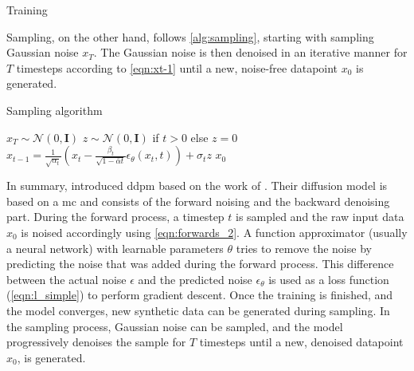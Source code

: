 \begin{algorithm}[T]
  \caption[Training algorithm]{Training \cite[p. 4]{ho2020DenoisingDiffusionProbabilistic}}
  \label{alg:training}
\end{algorithm}


Sampling, on the other hand, follows \autoref{alg:sampling}, starting with sampling Gaussian noise $x_T$.
The Gaussian noise is then denoised in an iterative manner for $T$ timesteps according to \autoref{eqn:xt-1} until a new, noise-free datapoint $x_0$ is generated.

\begin{algorithm}[H]
\caption[Sampling algorithm]{Sampling algorithm \cite[p. 4]{ho2020DenoisingDiffusionProbabilistic}}
  \label{alg:sampling}
  \begin{algorithmic}
  \State $x_T \sim \mathcal{N}(0, \mathbf{I})$
  \State $z \sim \mathcal{N}(0, \mathbf{I})$ if $t > 0$ else $z = 0$
  \State $x_{t-1} = \frac{1}{\sqrt{\alpha_t}}\left(x_t - \frac{\beta_t}{\sqrt{1-\bar{\alpha}t}}\epsilon_{\theta}(x_t,t)\right) + \sigma_t z$
  \EndFor
  \State \Return $x_0$
  \end{algorithmic}
\end{algorithm}

In summary, \cite{ho2020DenoisingDiffusionProbabilistic} introduced \gls{ddpm} based on the work of \cite{sohl-dickstein2015DeepUnsupervisedLearning}.
Their diffusion model is based on a \gls{mc} and consists of the forward noising and the backward denoising part.
During the forward process, a timestep $t$ is sampled and the raw input data $x_0$ is noised accordingly using \autoref{eqn:forwards_2}.
A function approximator (usually a neural network) with learnable parameters $\theta$ tries to remove the noise by predicting the noise that was added during the forward process.
This difference between the actual noise $\epsilon$ and the predicted noise $\epsilon_{\theta}$ is used as a loss function (\autoref{eqn:l_simple}) to perform gradient descent.
Once the training is finished, and the model converges, new synthetic data can be generated during sampling.
In the sampling process, Gaussian noise can be sampled, and the model progressively denoises the sample for $T$ timesteps until a new, denoised datapoint $x_0$, is generated.


